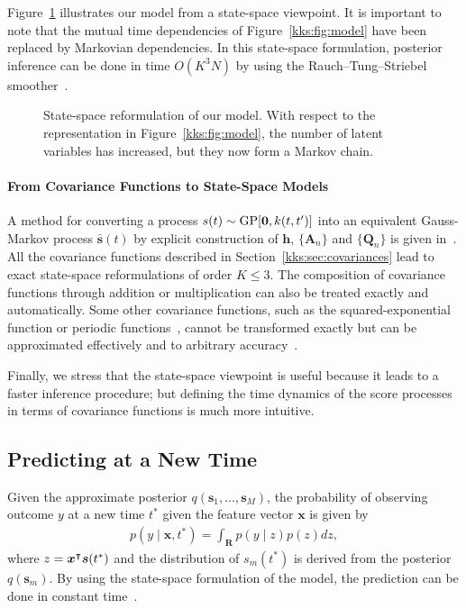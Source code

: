 Figure~\ref{kks:fig:ssm} illustrates our model from a state-space viewpoint.
It is important to note that the mutual time dependencies of Figure~\ref{kks:fig:model} have been replaced by Markovian dependencies.
In this state-space formulation, posterior inference can be done in time $O(K^3 N)$ by using the Rauch--Tung--Striebel smoother~\citep{sarkka2013bayesian}.

\begin{figure}[t]
	\centering
	
	\caption{State-space reformulation of our model.
		With respect to the representation in Figure~\ref{kks:fig:model}, the number of latent variables has increased, but they now form a Markov chain.}
	\label{kks:fig:ssm}
\end{figure}

\paragraph{From Covariance Functions to State-Space Models}
A method for converting a process $s(t) \sim \mathrm{GP}[\bm{0}, k(t, t')]$ into an equivalent Gauss-Markov process $\bar{\bm{s}}(t)$ by explicit construction of $\bm{h}$, $\{\bm{A}_n\}$ and $\{\bm{Q}_n\}$ is given in~\citet{solin2016stochastic}.
All the covariance functions described in Section~\ref{kks:sec:covariances} lead to exact state-space reformulations of order $K \leq 3$.
The composition of covariance functions through addition or multiplication can also be treated exactly and automatically.
Some other covariance functions, such as the squared-exponential function or periodic functions~\citep{rasmussen2006gaussian}, cannot be transformed exactly but can be approximated effectively and to arbitrary accuracy~\citep{hartikainen2010kalman, solin2014explicit}.

Finally, we stress that the state-space viewpoint is useful because it leads to a faster inference procedure; but defining the time dynamics of the score processes in terms of covariance functions is much more intuitive.


\subsection{Predicting at a New Time}

Given the approximate posterior $q(\bm{s}_1, \ldots, \bm{s}_M)$, the probability of observing outcome $y$ at a new time $t^*$ given the feature vector $\bm{x}$ is given by
\begin{align*}
	p(y \mid \bm{x}, t^*) = \int_\mathbf{R} p(y \mid z) p(z) dz,
\end{align*}
where $z = \bm{x}^\intercal \bm{s}(t^*)$ and the distribution of $s_m(t^*)$ is derived from the posterior $q(\bm{s}_m)$.
By using the state-space formulation of the model, the prediction can be done in constant time~\citep{saatci2012scalable}.
